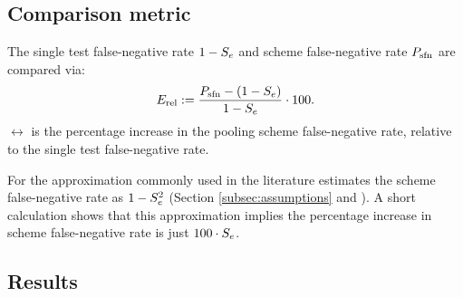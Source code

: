 \documentclass{article}
\begin{document}
\subsection{Comparison metric}
The single test false-negative rate $1-S_e$ and scheme false-negative
rate $P_{\text{sfn}}$ are compared via:
\begin{equation}\label{eq:erel}
E_{\text{rel}} := \frac{P_{\text{sfn}} - (1-S_e)}{1-S_e} \cdot 100.
\end{equation}
$\rel$ is the percentage increase in the pooling scheme false-negative
rate, relative to the single test false-negative rate.

For the approximation commonly used in the literature estimates the
scheme false-negative rate as $1-S_e^2$ (Section
\ref{subsec:assumptions} and \cite{Simplistic1, Simplistic2, Kim,
  OptimalDorfmanPool}). A short calculation shows that this
approximation implies the percentage increase in scheme false-negative
rate is just $100\cdot S_e$.

\subsection{Results}\label{section:results}
\end{document}
